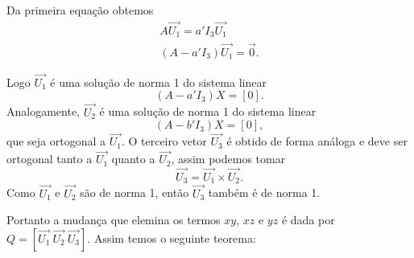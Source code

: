Da primeira equação obtemos
\begin{align*}
	A\vec{U_1} = a'I_3\vec{U_1}\\
	(A - a'I_3)\vec{U_1} = \vec{0}.
\end{align*}

Logo $\vec{U_1}$ é uma solução de norma 1 do sistema linear
\[
  (A - a'I_3)X = [0].
\]
Analogamente, $\vec{U_2}$ é uma solução de norma 1 do sistema linear
\[
  (A - b'I_3)X = [0],
\]
que seja ortogonal a $\vec{U_1}$. O terceiro vetor $\vec{U_3}$ é obtido de forma análoga e deve ser ortogonal tanto a $\vec{U_1}$ quanto a $\vec{U_2}$, assim podemos tomar
\[
	\vec{U_3} = \vec{U_1}\times\vec{U_2}.
\]
Como $\vec{U_1}$ e $\vec{U_2}$ são de norma 1, então $\vec{U_3}$ também é de norma 1.

Portanto a mudança que elemina os termos $xy$, $xz$ e $yz$ é dada por $Q = [\vec{U_1}\ \vec{U_2}\ \vec{U_3}]$. Assim temos o seguinte teorema:

